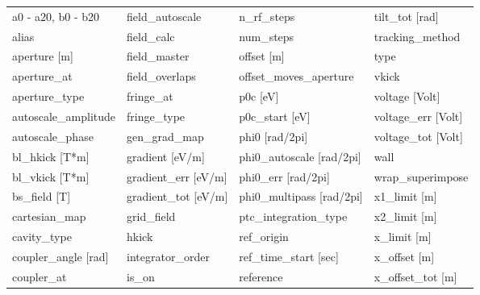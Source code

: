  \begin{tabular}{llll} \toprule
a0 - a20, b0 - b20               & field_autoscale                  & n_rf_steps                       & tilt_tot [rad]                   \\
alias                            & field_calc                       & num_steps                        & tracking_method                  \\
aperture [m]                     & field_master                     & offset [m]                       & type                             \\
aperture_at                      & field_overlaps                   & offset_moves_aperture            & vkick                            \\
aperture_type                    & fringe_at                        & p0c [eV]                         & voltage [Volt]                   \\
autoscale_amplitude              & fringe_type                      & p0c_start [eV]                   & voltage_err [Volt]               \\
autoscale_phase                  & gen_grad_map                     & phi0 [rad/2pi]                   & voltage_tot [Volt]               \\
bl_hkick [T*m]                   & gradient [eV/m]                  & phi0_autoscale [rad/2pi]         & wall                             \\
bl_vkick [T*m]                   & gradient_err [eV/m]              & phi0_err [rad/2pi]               & wrap_superimpose                 \\
bs_field [T]                     & gradient_tot [eV/m]              & phi0_multipass [rad/2pi]         & x1_limit [m]                     \\
cartesian_map                    & grid_field                       & ptc_integration_type             & x2_limit [m]                     \\
cavity_type                      & hkick                            & ref_origin                       & x_limit [m]                      \\
coupler_angle [rad]              & integrator_order                 & ref_time_start [sec]             & x_offset [m]                     \\
coupler_at                       & is_on                            & reference                        & x_offset_tot [m]                 \\

\end{tabular}
